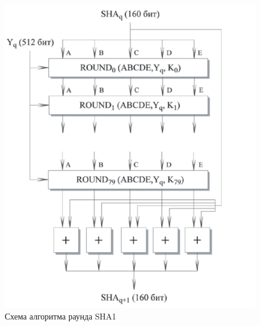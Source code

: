 \begin{figure}[ht!]
	\centering
	\includegraphics[width=0.8\linewidth]{img/sha1-iter.png}
	\caption{Схема алгоритма раунда SHA1}
	\label{img:sha-round}
\end{figure}
